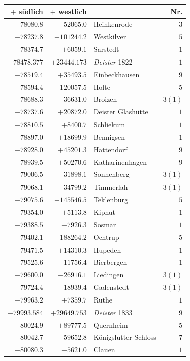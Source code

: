 \begin{center}\begingroup\fontsize{8}{9}\selectfont
\setlength{\tabcolsep}{4pt}
\begin{tabular}{r|r|p{170pt}|r}\hline
\(+\) südlich&\(+\) westlich&&Nr.\\\hline
\(-78080.8\)&\(-52065.0\)&Heinkenrode&\(3\)\\
\(-78237.8\)&\(+101244.2\)&Westkilver&\(5\)\\
\(-78374.7\)&\(+6059.1\)&Sarstedt&\(1\)\\
\(-78478.377\)&\(+23444.173\)&\textit{Deister} 1822&\(1\)\\
\(-78519.4\)&\(+35493.5\)&Einbeckhausen&\(9\)\\
\(-78594.4\)&\(+120057.5\)&Holte&\(5\)\\
\(-78688.3\)&\(-36631.0\)&Broizen&\(3 (1)\)\\
\(-78737.6\)&\(+20872.0\)&Deister Glashütte&\(1\)\\
\(-78810.5\)&\(+8400.7\)&Schliekum&\(1\)\\
\(-78897.0\)&\(+18699.9\)&Bennigsen&\(1\)\\
\(-78928.0\)&\(+45201.3\)&Hattendorf&\(9\)\\
\(-78939.5\)&\(+50270.6\)&Katharinenhagen&\(9\)\\
\(-79006.5\)&\(-31898.1\)&Sonnenberg&\(3 (1)\)\\
\(-79068.1\)&\(-34799.2\)&Timmerlah&\(3 (1)\)\\
\(-79075.6\)&\(+145546.5\)&Teklenburg&\(5\)\\
\(-79354.0\)&\(+5113.8\)&Kiphut&\(1\)\\
\(-79388.5\)&\(-7926.3\)&Sosmar&\(1\)\\
\(-79402.1\)&\(+188264.2\)&Ochtrup&\(5\)\\
\(-79471.5\)&\(+14310.3\)&Hupeden&\(1\)\\
\(-79525.6\)&\(-11756.4\)&Bierbergen&\(1\)\\
\(-79600.0\)&\(-26916.1\)&Liedingen&\(3 (1)\)\\
\(-79724.4\)&\(-18939.4\)&Gadenstedt&\(3 (1)\)\\
\(-79963.2\)&\(+7359.7\)&Ruthe&\(1\)\\
\(-79993.584\)&\(+29649.753\)&\textit{Deister} 1833&\(9\)\\
\(-80024.9\)&\(+89777.5\)&Quernheim&\(5\)\\
\(-80042.7\)&\(-59652.8\)&Königslutter Schloss&\(7\)\\
\(-80080.3\)&\(-5621.0\)&Clauen&\(1\)\\

\end{tabular}
\end{center}
